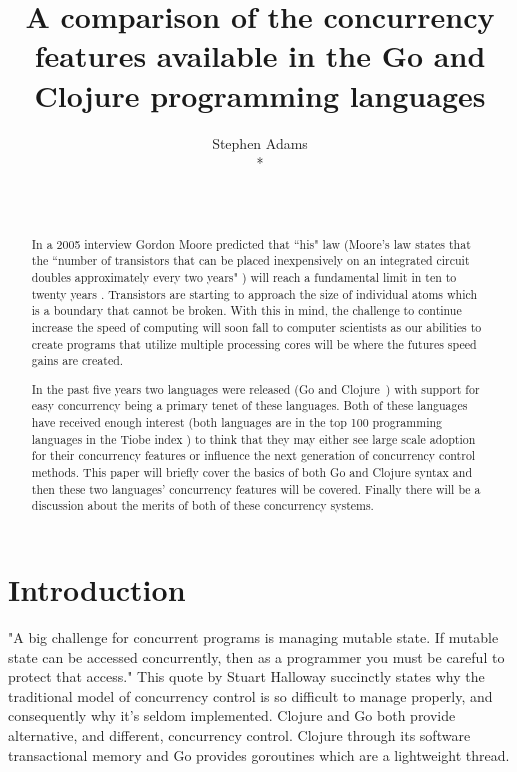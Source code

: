 \documentclass{acm_proc_article-sp}
\begin{document}
\title{A comparison of the concurrency features available in the Go and Clojure programming languages}

\author{
\alignauthor
Stephen Adams\\*
       \\
       \\
       \\
}

\maketitle
\begin{abstract}
	In a 2005 interview Gordon Moore predicted that ``his" law (Moore's law states that the ``number of transistors that can be placed inexpensively on an integrated circuit doubles approximately every two years" \cite{wiki:moore}) will reach a fundamental limit in ten to twenty years \cite{wiki:moore}. Transistors are starting to approach the size of individual atoms which is a boundary that cannot be broken. With this in mind, the challenge to continue increase the speed of computing will soon fall to computer scientists as our abilities to create programs that utilize multiple processing cores will be where the futures speed gains are created.
	
	In the past five years two languages were released (Go and Clojure~\cite{wiki:timeline}) with support for easy concurrency being a primary tenet of these languages. Both of these languages have received enough interest (both languages are in the top 100 programming languages in the Tiobe index \cite{tiobe}) to think that they may either see large scale adoption for their concurrency features or influence the next generation of concurrency control methods.
This paper will briefly cover the basics of both Go and Clojure syntax and then these two languages' concurrency features will be covered. Finally there will be a discussion about the merits of both of these concurrency systems.
\end{abstract}


\section{Introduction}
	"A big challenge for concurrent programs is managing mutable state. If mutable state can be accessed concurrently, then as a programmer you must be careful to protect that access."\cite{halloway} This quote by Stuart Halloway succinctly states why the traditional model of concurrency control is so difficult to manage properly, and consequently why it's seldom implemented. Clojure and Go both provide alternative, and different, concurrency control. Clojure through its software transactional memory\cite{wiki:clojure} and Go provides goroutines which are a lightweight thread\cite{wiki:go}. 
	
\end{document}
